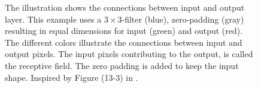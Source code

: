\begin{figure}
    \caption{The illustration shows the connections between input and output layer. This example uses a $3\times 3$-filter (blue), zero-padding (gray) resulting in equal dimensions for input (green) and output (red). The different colors illustrate the connections between input and output pixels. The input pixels contributing to the output, is called the receptive field. The zero padding is added to keep the input shape. Inspired by Figure (13-3) in \cite{OReiley_book}. 
    }
    \label{fig:convolution_padding}
\end{figure}
